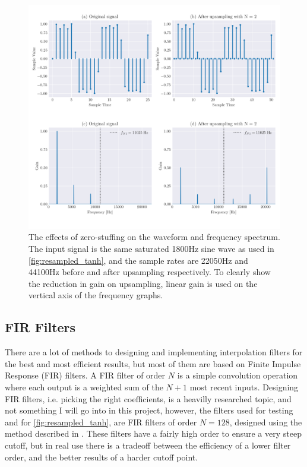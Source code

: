\begin{figure}
  \centering
  \includegraphics[width=\textwidth]{Pictures/interpolation.png}
  \caption{The effects of zero-stuffing on the waveform and frequency spectrum. The input signal is the same saturated
    1800Hz sine wave as used in \autoref{fig:resampled_tanh}, and the sample rates are 22050Hz and 44100Hz before and  after upsampling respectively. To clearly show the
    reduction in gain on upsampling, linear gain is used on the vertical axis of the frequency graphs.}
  \label{fig:interpolation}
\end{figure}

\subsection{FIR Filters}
\label{sec:fir_filters}

There are a lot of methods to designing and implementing interpolation filters for the best and most
efficient results, but most of them are based on Finite Impulse Response (FIR) filters. A FIR filter of order
$N$ is a simple convolution operation where each output is a weighted sum of the
$N + 1$ most recent inputs. Designing FIR filters, i.e. picking the right coefficients, is a
heavilly researched topic\autocite{kahles2019oversampling, SORIA2013, thomas2009}, and not something I will go into in this project, however,
the filters used for testing and for \autoref{fig:resampled_tanh}, are FIR filters of order $N = 128$,
designed using the method described in \autocite{fiir}. These filters have a fairly high order to
ensure a very steep cutoff, but in real use there is a tradeoff between the efficiency of a lower filter
order, and the better results of a harder cutoff point.

